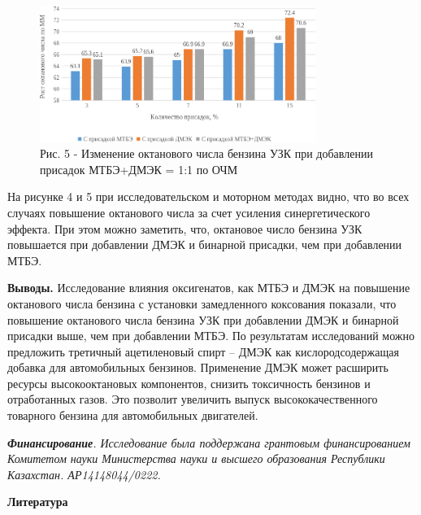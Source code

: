 \begin{figure}[H]
	\centering
	\includegraphics[width=0.8\textwidth]{media/chem/image101}
	\caption*{Рис. 5 - Изменение октанового числа бензина УЗК при добавлении
присадок МТБЭ+ДМЭК = 1:1 по ОЧМ}
\end{figure}

\begin{multicols}{2}
На рисунке 4 и 5 при исследовательском и моторном методах видно, что во
всех случаях повышение октанового числа за счет усиления
синергетического эффекта. При этом можно заметить, что, октановое число
бензина УЗК повышается при добавлении ДМЭК и бинарной присадки, чем при
добавлении МТБЭ.

{\bfseries Выводы.} Исследование влияния оксигенатов, как МТБЭ и ДМЭК на
повышение октанового числа бензина с установки замедленного коксования
показали, что повышение октанового числа бензина УЗК при добавлении ДМЭК
и бинарной присадки выше, чем при добавлении МТБЭ. По результатам
исследований можно предложить третичный ацетиленовый спирт -- ДМЭК как
кислородсодержащая добавка для автомобильных бензинов. Применение ДМЭК
может расширить ресурсы высокооктановых компонентов, снизить токсичность
бензинов и отработанных газов. Это позволит увеличить выпуск
высококачественного товарного бензина для автомобильных двигателей.

\emph{{\bfseries Финансирование}. Исследование была поддержана грантовым
финансированием Комитетом науки Министерства науки и высшего образования
Республики Казахстан. АР14148044/0222.}
\end{multicols}

\begin{center}
{\bfseries Литература}
\end{center}

